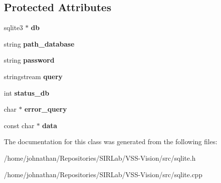 \subsection*{Protected Attributes}
\begin{DoxyCompactItemize}
\item 
sqlite3 $\ast$ {\bfseries db}\hypertarget{classSQLite_a1d24b48aa333500d31dd1741c474ee77}{}\label{classSQLite_a1d24b48aa333500d31dd1741c474ee77}

\item 
string {\bfseries path\+\_\+database}\hypertarget{classSQLite_a35c90bc05faa587c66031661a365db20}{}\label{classSQLite_a35c90bc05faa587c66031661a365db20}

\item 
string {\bfseries password}\hypertarget{classSQLite_a5db7ea6ca4da520fb5125631b081acb9}{}\label{classSQLite_a5db7ea6ca4da520fb5125631b081acb9}

\item 
stringstream {\bfseries query}\hypertarget{classSQLite_a524b7fb749c55eae9076981de81f6576}{}\label{classSQLite_a524b7fb749c55eae9076981de81f6576}

\item 
int {\bfseries status\+\_\+db}\hypertarget{classSQLite_ab54d46b70b16ac3d91631c926d633d42}{}\label{classSQLite_ab54d46b70b16ac3d91631c926d633d42}

\item 
char $\ast$ {\bfseries error\+\_\+query}\hypertarget{classSQLite_a641bc6c63769eee5ab03dfd0cd26f0bc}{}\label{classSQLite_a641bc6c63769eee5ab03dfd0cd26f0bc}

\item 
const char $\ast$ {\bfseries data}\hypertarget{classSQLite_a7c608c690c08fce28810d549ab488074}{}\label{classSQLite_a7c608c690c08fce28810d549ab488074}

\end{DoxyCompactItemize}


The documentation for this class was generated from the following files\+:\begin{DoxyCompactItemize}
\item 
/home/johnathan/\+Repositories/\+S\+I\+R\+Lab/\+V\+S\+S-\/\+Vision/src/sqlite.\+h\item 
/home/johnathan/\+Repositories/\+S\+I\+R\+Lab/\+V\+S\+S-\/\+Vision/src/sqlite.\+cpp\end{DoxyCompactItemize}
